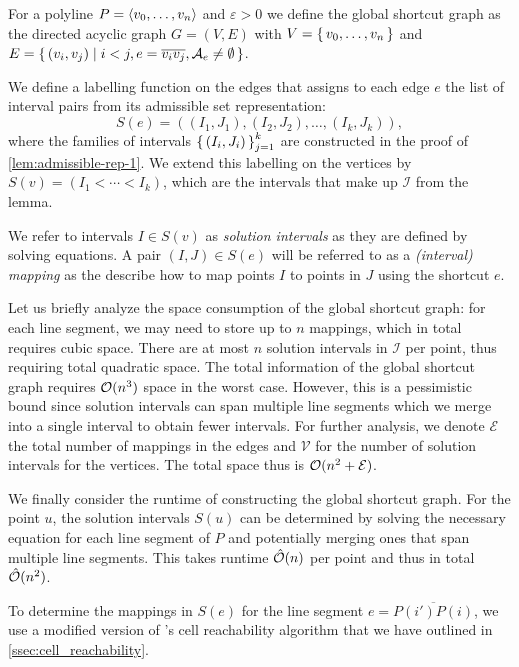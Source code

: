 \begin{definition}
	For a polyline \(P = \left\langle v_0, \dots, v_n\right\rangle\) and \(\varepsilon > 0\) we define the global shortcut graph as the directed acyclic graph \(G = (V, E)\) with \(V = \set{v_0, \dots, v_n}\) and \(E = \set{(v_i, v_j) \mid i < j, e = \overline{v_iv_j}, \mathcal{A}_e \neq \emptyset}\).

	We define a labelling function on the edges that assigns to each edge \(e\) the list of interval pairs from its admissible set representation:
	\[S(e) = ((I_1, J_1), (I_2, J_2), \dots, (I_k, J_k)),\]
	where the families of intervals \(\set{(I_i, J_i)}_{j=1}^k\) are constructed in the proof of \cref{lem:admissible-rep-1}. We extend this labelling on the vertices by \(S(v) = (I_1 < \cdots < I_k)\), which are the intervals that make up \(\mathcal{I}\) from the lemma.

	We refer to intervals \(I \in S(v)\) as \emph{solution intervals} as they are defined by solving equations. A pair \((I, J) \in S(e)\) will be referred to as a \emph{(interval) mapping} as the describe how to map points \(I\) to points in \(J\) using the shortcut \(e\).
\end{definition}

Let us briefly analyze the space consumption of the global shortcut graph: for each line segment, we may need to store up to \(n\) mappings, which in total requires cubic space. There are at most \(n\) solution intervals in \(\mathcal{I}\) per point, thus requiring total quadratic space. The total information of the global shortcut graph requires \(\mathcal{O}(n^3)\) space in the worst case. However, this is a pessimistic bound since solution intervals can span multiple line segments which we merge into a single interval to obtain fewer intervals. For further analysis, we denote \(\mathcal{E}\) the total number of mappings in the edges and \(\mathcal{V}\) for the number of solution intervals for the vertices. The total space thus is \(\mathcal{O}(n^2 + \mathcal{E})\).

We finally consider the runtime of constructing the global shortcut graph. For the point \(u\), the solution intervals \(S(u)\) can be determined by solving the necessary equation for each line segment of \(P\) and potentially merging ones that span multiple line segments. This takes runtime \(\hat{\mathcal{O}}(n)\) per point and thus in total \(\hat{\mathcal{O}}(n^2)\). 

To determine the mappings in \(S(e)\) for the line segment \(e = \overline{P(i')P(i)}\), we use a modified version of \citeauthor{polyline_simplification_has_cubic_complexity_bringmannetal}'s cell reachability algorithm that we have outlined in \cref{ssec:cell_reachability}.

